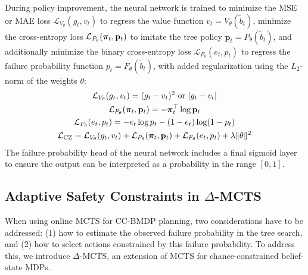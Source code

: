 During policy improvement, the neural network is trained to minimize the MSE or MAE loss $\mathcal{L}_{V_\theta}(g_t, v_t)$ to regress the value function $v_t = V_\theta(\tilde{b}_t)$, minimize the cross-entropy loss $\mathcal{L}_{P_\theta}(\boldsymbol\pi_t, \mathbf{p}_t)$ to imitate the tree policy $\mathbf{p}_t = P_\theta(\tilde{b}_t)$, and additionally minimize the binary cross-entropy loss $\mathcal{L}_{F_\theta}(e_t, p_t)$ to regress the failure probability function $p_t = F_\theta(\tilde{b}_t)$, with added regularization using the $L_2$-norm of the weights $\theta$:
\begin{gather*}
    \mathcal{L}_{V_\theta}(g_t, v_t) = (g_t - v_t)^2 \text{ or } |g_t - v_t|\\
    \mathcal{L}_{P_\theta}(\boldsymbol\pi_t, \mathbf{p}_t) = -\boldsymbol\pi_t^\top \log \mathbf{p}_t\\
    \mathcal{L}_{F_\theta}(e_t, p_t) = -e_t \log p_t - (1-e_t)\log(1-p_t)\\
    \mathcal{L}_\text{CZ} = \mathcal{L}_{V_\theta}(g_t, v_t) + \mathcal{L}_{P_\theta}(\boldsymbol\pi_t, \mathbf{p}_t) + \mathcal{L}_{F_\theta}(e_t, p_t) + \lambda\lVert\theta\rVert^2
\end{gather*}
The failure probability head of the neural network includes a final sigmoid layer to ensure the output can be interpreted as a probability in the range $[0,1]$.

\begin{figure}[t!]
    \centering
    
\end{figure}


\subsection{Adaptive Safety Constraints in \texorpdfstring{$\Delta$}{Δ}-MCTS}
When using online MCTS for CC-BMDP planning, two considerations have to be addressed: (1) how to estimate the observed failure probability in the tree search, and (2) how to select actions constrained by this failure probability. To address this, we introduce $\Delta$-MCTS, an extension of MCTS for chance-constrained belief-state MDPs.

